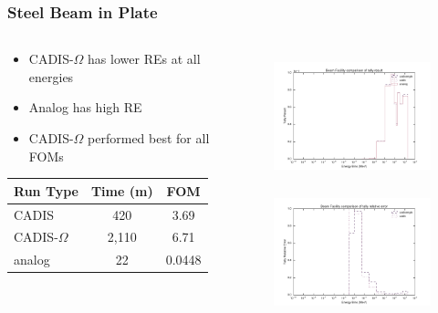 \documentclass[xcolor=x11names,compress]{beamer}
\renewcommand{\(}{\begin{columns}}
\renewcommand{\)}{\end{columns}}
\newcommand{\<}[1]{\begin{column}{#1}}
\renewcommand{\>}{\end{column}}
\begin{document}
\begin{frame}[fragile]
  \frametitle{Steel Beam in Plate}
  
\begin{columns}
  \begin{column}{0.45\textwidth}
  \begin{itemize}
    \item CADIS-$\Omega$ has lower REs at all energies
    \item Analog has high RE
    \item CADIS-$\Omega$ performed best for all FOMs
  \end{itemize}
  \vspace*{1em}
  
  \begin{tabular}{|l|c c|}
  \hline
      Run Type & Time (m) & FOM \\  
      \hline
      CADIS  & 420  &  3.69 \\
      CADIS-$\Omega$ & 2,110 & \alert{6.71} \\
      analog & 22 &  0.0448 \\
      \hline
  \end{tabular}  
  \end{column}
  \begin{column}{0.55\textwidth}
  	\begin{figure}
  	\begin{center}
  		\includegraphics[height=1.5in,clip]{../figs/beam_facility_tally_result_compare.pdf}\\
  		\includegraphics[height=1.5in,clip]{../figs/beam_facility_tally_error_compare.pdf}
	\end{center}
  	\end{figure}
  \end{column}
\end{columns}
\end{frame}
\end{document}
